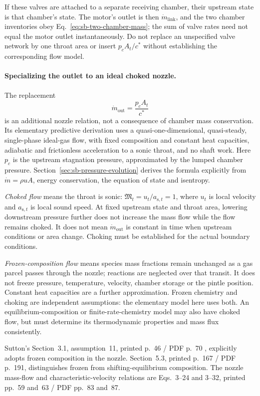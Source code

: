If these valves are attached to a separate receiving chamber, their
upstream state is that chamber's state. The motor's outlet is then
$\dot m_{\mathrm{link}}$, and the two chamber inventories obey
Eq.~\eqref{eq:sb-two-chamber-mass}; the sum of valve rates need not equal
the motor outlet instantaneously. Do not replace an unspecified valve
network by one throat area or insert $p_cA_t/c^*$ without establishing
the corresponding flow model.

\paragraph{Specializing the outlet to an ideal choked nozzle.}
The replacement
\[
 \dot m_{\mathrm{out}}=\frac{p_cA_t}{c^*}
\]
is an additional nozzle relation, not a consequence of chamber mass
conservation. Its elementary predictive derivation uses a
quasi-one-dimensional, quasi-steady, single-phase ideal-gas flow,
with fixed composition and constant heat capacities, adiabatic and
frictionless acceleration to a sonic throat, and no shaft work.
Here $p_c$ is the upstream stagnation pressure, approximated by the
lumped chamber pressure. Section~\ref{sec:sb-pressure-evolution}
derives the formula explicitly from $\dot m=\rho uA$, energy conservation,
the equation of state and isentropy.

\emph{Choked flow} means the throat is sonic:
$\mathfrak M_t=u_t/a_{\mathrm{s},t}=1$, where $u_t$ is local velocity and
$a_{\mathrm{s},t}$ is local sound speed. At fixed upstream state and
throat area, lowering downstream pressure further does not increase
the mass flow while the flow remains choked. It does not mean
$\dot m_{\mathrm{out}}$ is constant in time when upstream conditions
or area change. Choking must be established for the actual boundary
conditions.

\emph{Frozen-composition flow} means species mass fractions remain
unchanged as a gas parcel passes through the nozzle; reactions are
neglected over that transit. It does not freeze pressure, temperature,
velocity, chamber storage or the pintle position. Constant heat
capacities are a further approximation. Frozen chemistry and choking
are independent assumptions: the elementary model here uses both.
An equilibrium-composition or finite-rate-chemistry model may also
have choked flow, but must determine its thermodynamic properties and
mass flux consistently.

Sutton's Section~3.1, assumption~11, printed p.~46 / PDF p.~70
\cite{sutton}, explicitly adopts frozen composition in the nozzle.
Section~5.3, printed p.~167 / PDF p.~191, distinguishes frozen from
shifting-equilibrium composition. The nozzle mass-flow and
characteristic-velocity relations are Eqs.~3--24 and 3--32,
printed pp.~59 and~63 / PDF pp.~83 and~87.


